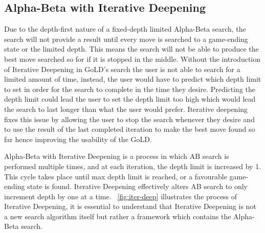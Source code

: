 \documentclass{l4proj}
\begin{document}
\subsection{Alpha-Beta with Iterative Deepening}

Due to the depth-first nature of a fixed-depth limited Alpha-Beta search, the search will not provide a result until every move is searched to a game-ending state or the limited depth. This means the search will not be able to produce the best move searched so for if it is stopped in the middle. Without the introduction of Iterative Deepening in GoLD’s search the user is not able to search for a limited amount of time, instead, the user would have to predict which depth limit to set in order for the search to complete in the time they desire. Predicting the depth limit could lead the user to set the depth limit too high which would lead the search to last longer than what the user would prefer. Iterative deepening fixes this issue by allowing the user to stop the search whenever they desire and to use the result of the last completed iteration to make the best move found so far hence improving the usability of the GoLD.

Alpha-Beta with Iterative Deepening is a process in which AB search is performed multiple times, and at each iteration, the depth limit is increased by 1. This cycle takes place until max depth limit is reached, or a favourable game-ending state is found. Iterative Deepening effectively alters AB search to only increment depth by one at a time.  ~\autoref{fig:iter-deep} illustrates the process of Iterative Deepening, it is essential to understand that Iterative Deepening is not a new search algorithm itself but rather a framework which contains the Alpha-Beta search.
\end{document}
